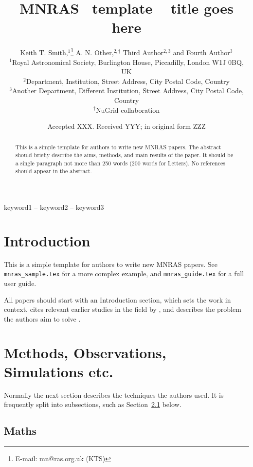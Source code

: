 \documentclass[fleqn,usenatbib]{mnras}
\title[Short title, max. 45 characters]{MNRAS \LaTeXe\ template -- title goes here}
\author[K. T. Smith et al.]{
Keith T. Smith,$^{1}$\thanks{E-mail: mn@ras.org.uk (KTS)}
A. N. Other,$^{2,\dagger}$
Third Author$^{2,3}$
and Fourth Author$^{3}$
\\
$^{1}$Royal Astronomical Society, Burlington House, Piccadilly, London W1J 0BQ, UK\\
$^{2}$Department, Institution, Street Address, City Postal Code, Country\\
$^{3}$Another Department, Different Institution, Street Address, City Postal Code, Country\\
$^\dagger$NuGrid collaboration}
\date{Accepted XXX. Received YYY; in original form ZZZ}
\begin{document}
\label{firstpage}
\pagerange{\pageref{firstpage}--\pageref{lastpage}}
\maketitle

\begin{abstract}
This is a simple template for authors to write new MNRAS papers.
The abstract should briefly describe the aims, methods, and main results of the paper.
It should be a single paragraph not more than 250 words (200 words for Letters).
No references should appear in the abstract.
\end{abstract}

\begin{keywords}
keyword1 -- keyword2 -- keyword3
\end{keywords}



\section{Introduction}

This is a simple template for authors to write new MNRAS papers.
See \texttt{mnras\_sample.tex} for a more complex example, and \texttt{mnras\_guide.tex}
for a full user guide.

All papers should start with an Introduction section, which sets the work
in context, cites relevant earlier studies in the field by \citet{1996ApJ...456..902R},
and describes the problem the authors aim to solve \citep[e.g.][]{cyburt:10}.

\section{Methods, Observations, Simulations etc.}

Normally the next section describes the techniques the authors used.
It is frequently split into subsections, such as Section~\ref{sec:maths} below.

\subsection{Maths}
\label{sec:maths} %
\end{document}
